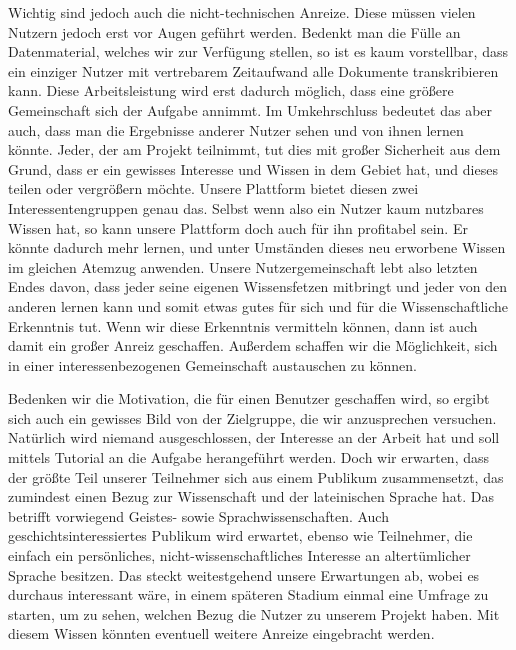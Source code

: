 \documentclass{article}
\begin{document}
Wichtig sind jedoch auch die nicht-technischen Anreize.
Diese müssen vielen Nutzern jedoch erst vor Augen geführt werden.
Bedenkt man die Fülle an Datenmaterial, welches wir zur Verfügung stellen, so ist es kaum vorstellbar,
dass ein einziger Nutzer mit vertrebarem Zeitaufwand alle Dokumente transkribieren kann.
Diese Arbeitsleistung wird erst dadurch möglich, dass eine größere Gemeinschaft sich der Aufgabe annimmt.
Im Umkehrschluss bedeutet das aber auch, dass man die Ergebnisse anderer Nutzer sehen und von ihnen lernen könnte. %
Jeder, der am Projekt teilnimmt, tut dies mit großer Sicherheit aus dem Grund,
dass er ein gewisses Interesse und Wissen in dem Gebiet hat, und dieses teilen oder vergrößern möchte.
Unsere Plattform bietet diesen zwei Interessentengruppen genau das.
Selbst wenn also ein Nutzer kaum nutzbares Wissen hat, so kann unsere Plattform doch auch für ihn profitabel sein.
Er könnte dadurch mehr lernen, und unter Umständen dieses neu erworbene Wissen im gleichen Atemzug anwenden.
Unsere Nutzergemeinschaft lebt also letzten Endes davon, dass jeder seine eigenen Wissensfetzen mitbringt
und jeder von den anderen lernen kann und somit etwas gutes für sich und für die Wissenschaftliche Erkenntnis tut.%
Wenn wir diese Erkenntnis vermitteln können, dann ist auch damit ein großer Anreiz geschaffen.
Außerdem schaffen wir die Möglichkeit, sich in einer interessenbezogenen Gemeinschaft austauschen zu können.

Bedenken wir die Motivation, die für einen Benutzer geschaffen wird, so ergibt sich auch ein gewisses Bild von der Zielgruppe, die wir anzusprechen versuchen.
Natürlich wird niemand ausgeschlossen, der Interesse an der Arbeit hat und soll mittels Tutorial an die Aufgabe herangeführt werden.
Doch wir erwarten, dass der größte Teil unserer Teilnehmer sich aus einem Publikum zusammensetzt,
das zumindest einen Bezug zur Wissenschaft und der lateinischen Sprache hat.
Das betrifft vorwiegend Geistes- sowie Sprachwissenschaften. Auch geschichtsinteressiertes Publikum wird erwartet,
ebenso wie Teilnehmer, die einfach ein persönliches, nicht-wissenschaftliches Interesse an altertümlicher Sprache besitzen.
Das steckt weitestgehend unsere Erwartungen ab, wobei es durchaus interessant wäre, in einem späteren Stadium einmal eine Umfrage zu starten, um zu sehen,
welchen Bezug die Nutzer zu unserem Projekt haben. Mit diesem Wissen könnten eventuell weitere Anreize eingebracht werden.

\end{document}
